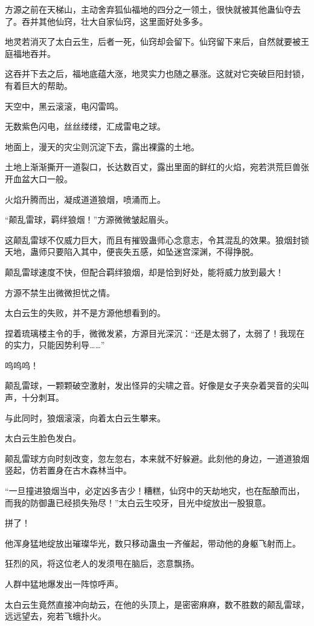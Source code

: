 \begin{this_body}
方源之前在天梯山，主动舍弃狐仙福地的四分之一领土，很快就被其他蛊仙夺去了。吞并其他仙窍，壮大自家仙窍，这里面好处多多。

地灵若消灭了太白云生，后者一死，仙窍却会留下。仙窍留下来后，自然就要被王庭福地吞并。

这吞并下去之后，福地底蕴大涨，地灵实力也随之暴涨。这就对它突破巨阳封锁，有着巨大的帮助。

天空中，黑云滚滚，电闪雷鸣。

无数紫色闪电，丝丝缕缕，汇成雷电之球。

地面上，漫天的灾尘则沉淀下去，露出裸露的土地。

土地上渐渐撕开一道裂口，长达数百丈，露出里面的鲜红的火焰，宛若洪荒巨兽张开血盆大口一般。

火焰升腾而出，凝成道道狼烟，喷涌而上。

“颠乱雷球，羁绊狼烟！”方源微微皱起眉头。

这颠乱雷球不仅威力巨大，而且有摧毁蛊师心念意志，令其混乱的效果。狼烟封锁天地，蛊师只要陷入其中，便丧失五感，如坠迷宫深渊，不得挣脱。

颠乱雷球速度不快，但配合羁绊狼烟，却是恰到好处，能将威力放到最大！

方源不禁生出微微担忧之情。

太白云生的失败，并不是方源他想看到的。

捏着琉璃楼主令的手，微微发紧，方源目光深沉：“还是太弱了，太弱了！我现在的实力，只能因势利导……”

呜呜呜！

颠乱雷球，一颗颗破空激射，发出怪异的尖啸之音。好像是女子夹杂着哭音的尖叫声，十分刺耳。

与此同时，狼烟滚滚，向着太白云生攀来。

太白云生脸色发白。

颠乱雷球方向时刻改变，忽左忽右，本来就不好躲避。此刻他的身边，一道道狼烟竖起，仿若置身在古木森林当中。

“一旦撞进狼烟当中，必定凶多吉少！糟糕，仙窍中的天劫地灾，也在酝酿而出，而我的防御蛊已经损失殆尽！”太白云生咬牙，目光中绽放出一股狠意。

拼了！

他浑身猛地绽放出璀璨华光，数只移动蛊虫一齐催起，带动他的身躯飞射而上。

狂烈的风，将这位老人的发须甩在脑后，恣意飘扬。

人群中猛地爆发出一阵惊呼声。

太白云生竟然直接冲向劫云，在他的头顶上，是密密麻麻，数不胜数的颠乱雷球，远远望去，宛若飞蛾扑火。


\end{this_body}
